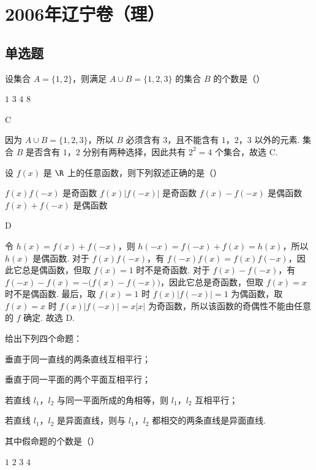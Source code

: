 \chapter{2006年辽宁卷（理）}
\section{单选题}
\begin{problem}
设集合 \(A = \{1, 2\}\)，则满足 \(A \cup B = \{1, 2, 3\}\) 的集合 \(B\) 的个数是（\quad）

\choices
    {\(1\)}
    {\(3\)}
    {\(4\)}
    {\(8\)}
\end{problem}

\begin{answer}
C
\end{answer}

\begin{solution}
因为 \(A\cup B=\{1,2,3\}\)，所以 \(B\) 必须含有 \(3\)，且不能含有 \(1\)，\(2\)，\(3\) 以外的元素. 集合 \(B\) 是否含有 \(1\)，\(2\) 分别有两种选择，因此共有 \(2^2=4\) 个集合，故选 C.
\end{solution}

\begin{problem}
设 \( f(x) \) 是 \( \R \) 上的任意函数，则下列叙述正确的是（\quad）

\choices
    {\(f(x)f(-x)\) 是奇函数}
    {\(f(x)|f(-x)|\) 是奇函数}
    {\(f(x) - f(-x)\) 是偶函数}
    {\(f(x) + f(-x)\) 是偶函数}
\end{problem}

\begin{answer}
D
\end{answer}

\begin{solution}
令 \(h(x)=f(x)+f(-x)\)，则 \(h(-x)=f(-x)+f(x)=h(x)\)，所以 \(h(x)\) 是偶函数. 对于 \(f(x)f(-x)\)，有 \(f(-x)f(x)=f(x)f(-x)\)，因此它总是偶函数，但取 \(f(x)=1\) 时不是奇函数. 对于 \(f(x)-f(-x)\)，有 \(f(-x)-f(x)=-\bigl(f(x)-f(-x)\bigr)\)，因此它总是奇函数，但取 \(f(x)=x\) 时不是偶函数. 最后，取 \(f(x)=1\) 时 \(f(x)|f(-x)|=1\) 为偶函数，取 \(f(x)=x\) 时 \(f(x)|f(-x)|=x|x|\) 为奇函数，所以该函数的奇偶性不能由任意的 \(f\) 确定. 故选 D.
\end{solution}

\begin{problem}
给出下列四个命题：

\begin{circlelist}
\item 垂直于同一直线的两条直线互相平行；
\item 垂直于同一平面的两个平面互相平行；
\item 若直线 \(l_{1}\)，\(l_{2}\) 与同一平面所成的角相等，则 \(l_{1}\)，\(l_{2}\) 互相平行；
\item 若直线 \(l_{1}\)，\(l_{2}\) 是异面直线，则与 \(l_{1}\)，\(l_{2}\) 都相交的两条直线是异面直线.
\end{circlelist}

其中假命题的个数是（\quad）

\choices
    {\(1\)}
    {\(2\)}
    {\(3\)}
    {\(4\)}
\end{problem}

